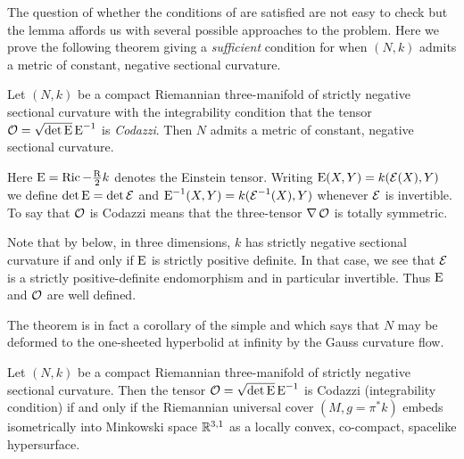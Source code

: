 \documentclass[a4paper, 12pt]{amsart}
\begin{document}
The question of whether the conditions of  are satisfied are not easy to check but the lemma affords us with several possible approaches to the problem. Here we prove the following theorem giving a \emph{sufficient} condition for when \((N, k)\) admits a metric of constant, negative sectional curvature.
\begin{thm}
\label{thm:intg_const_curv}
Let \((N, k)\) be a compact Riemannian three-manifold of strictly negative sectional curvature with the integrability condition that the tensor \(\operatorname{\mathcal{O}} = \sqrt{\det \operatorname{E}} \operatorname{E}^{-1}\) is \emph{Codazzi}. Then \(N\) admits a metric of constant, negative sectional curvature.
\end{thm}
Here \(\operatorname{E} = \operatorname{Ric} - \tfrac{\operatorname{R}}{2}k\) denotes the Einstein tensor. Writing \(\operatorname{E}(X, Y) = k(\operatorname{\mathcal{E}}(X), Y)\) we define \(\det \operatorname{E} = \det \operatorname{\mathcal{E}}\) and \(\operatorname{E}^{-1}(X, Y) = k(\operatorname{\mathcal{E}}^{-1} (X), Y)\) whenever \(\operatorname{\mathcal{E}}\) is invertible. To say that \(\operatorname{\mathcal{O}}\) is Codazzi means that the three-tensor \(\nabla \operatorname{\mathcal{O}}\) is totally symmetric.
\begin{rem}
Note that by  below, in three dimensions, \(k\) has strictly negative sectional curvature if and only if \(\operatorname{E}\) is strictly positive definite. In that case, we see that \(\operatorname{\mathcal{E}}\) is a strictly positive-definite endomorphism and in particular invertible. Thus \(\operatorname{E}\) and \(\operatorname{\mathcal{O}}\) are well defined.
\end{rem}
The theorem is in fact a corollary of the simple  and \cite[Theorem 1.1]{MR3344442} which says that \(N\) may be deformed to the one-sheeted hyperbolid at infinity by the Gauss curvature flow.
\begin{thm}
\label{thm:intg_embed}
Let \((N, k)\) be a compact Riemannian three-manifold of strictly negative sectional curvature. Then the tensor \(\operatorname{\mathcal{O}} = \sqrt{\det \operatorname{E}} \operatorname{E}^{-1}\) is Codazzi (integrability condition) if and only if the Riemannian universal cover \((M, g = \pi^{\ast} k)\) embeds isometrically into Minkowski space \(\mathbb{R}^{3,1}\) as a locally convex, co-compact, spacelike hypersurface.
\end{thm}
\end{document}

